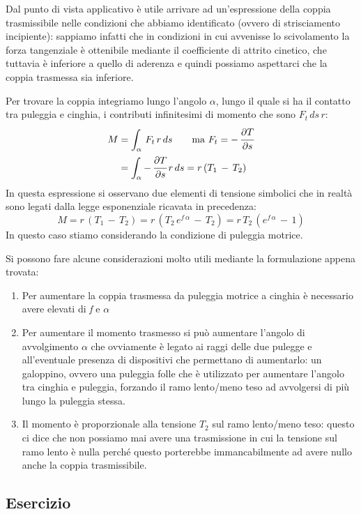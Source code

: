 Dal punto di vista applicativo è utile arrivare ad un'espressione della coppia trasmissibile nelle condizioni che abbiamo identificato (ovvero di strisciamento incipiente): sappiamo infatti che in condizioni in cui avvenisse lo scivolamento la forza tangenziale è ottenibile mediante il coefficiente di attrito cinetico, che tuttavia è inferiore a quello di aderenza e quindi possiamo aspettarci che la coppia trasmessa sia inferiore.

Per trovare la coppia integriamo lungo l'angolo $\alpha$, lungo il quale si ha il contatto tra puleggia e cinghia, i contributi infinitesimi di momento che sono $F_t\,ds\,r$:
\begin{align*}
M &= \int_{\alpha}\,F_t\,r\,ds\qquad\text{ma } F_t = -\,\cfrac{\partial T}{\partial s}\\
&= \int_{\alpha}-\,\cfrac{\partial T}{\partial s}\,r\,ds = r\,(T_1\,-\,T_2)
\end{align*}
In questa espressione si osservano due elementi di tensione simbolici che in realtà sono legati dalla legge esponenziale ricavata in precedenza:
\[M = r\,(T_1\,-\,T_2) = r\,(T_2\,e^{f\,\alpha}\,-\,T_2) = r\,T_2\,(e^{f\,\alpha}\,-\,1)\]
In questo caso stiamo considerando la condizione di puleggia motrice.

Si possono fare alcune considerazioni molto utili mediante la formulazione appena trovata:
\begin{enumerate}
\item Per aumentare la coppia trasmessa da puleggia motrice a cinghia è necessario avere elevati di \emph{f} e $\alpha$
\item Per aumentare il momento trasmesso si può aumentare l'angolo di avvolgimento $\alpha$ che ovviamente è legato ai raggi delle due pulegge e all'eventuale presenza di dispositivi che permettano di aumentarlo: un galoppino, ovvero una puleggia folle che è utilizzato per aumentare l'angolo tra cinghia e puleggia, forzando il ramo lento/meno teso ad avvolgersi di più lungo la puleggia stessa.
\item Il momento è proporzionale alla tensione $T_2$ sul ramo lento/meno teso: questo ci dice che non possiamo mai avere una trasmissione in cui la tensione sul ramo lento è nulla perché questo porterebbe immancabilmente ad avere nullo anche la coppia trasmissibile.
\end{enumerate}

\subsection{Esercizio}

